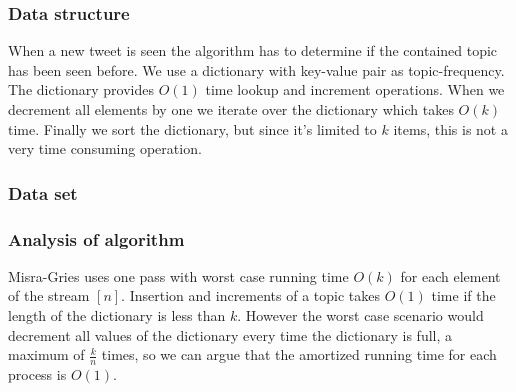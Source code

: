 \subsubsection{Data structure}
When a new tweet is seen the algorithm has to determine if the contained topic has been seen before. We use a dictionary with key-value pair as topic-frequency. The dictionary provides $O(1)$ time lookup and increment operations. When we decrement all elements by one we iterate over the dictionary which takes $O(k)$ time. Finally we sort the dictionary, but since it's limited to $k$ items, this is not a very time consuming operation.

\subsubsection{Data set}\label{algo-data}

\subsubsection{Analysis of algorithm}\label{algo-analysis}
Misra-Gries uses one pass with worst case running time $O(k)$ for each element of the stream $[n]$. Insertion and increments of a topic takes $O(1)$ time if the length of the dictionary is less than $k$. However the worst case scenario would decrement all values of the dictionary every time the dictionary is full, a maximum of $\frac{k}{n}$ times, so we can argue that the amortized running time for each process is $O(1)$.
